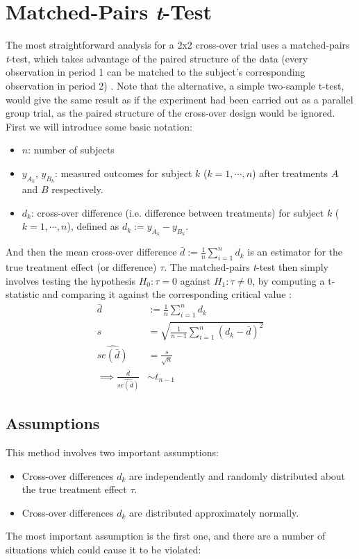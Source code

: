 \documentclass[12pt, TexShade, letterpaper]{report}
\begin{document}
\section{Matched-Pairs \textit{t}-Test}
The most straightforward analysis for a 2x2 cross-over trial uses a matched-pairs \textit{t}-test, which takes advantage of the paired structure of the data (every observation in period 1 can be matched to the subject's corresponding observation in period 2) \cite{senn2002crossover}. Note that the alternative, a simple two-sample t-test, would give the same result as if the experiment had been carried out as a parallel group trial, as the paired structure of the cross-over design would be ignored. First we will introduce some basic notation:
\begin{itemize}
    \item $n$: number of subjects
    \item $y_{A_k}$, $y_{B_k}$: measured outcomes for subject $k$ ($k=1,\cdots,n$) after treatments $A$ and $B$ respectively.
    \item $d_k$: cross-over difference (i.e. difference between treatments) for subject $k$ ($k=1,\cdots,n$), defined as $d_k := y_{A_k}-y_{B_k}$.
\end{itemize}
And then the mean cross-over difference $\bar{d} := \frac{1}{n}\sum_{i=1}^{n}d_k$ is an estimator for the true treatment effect (or difference) $\tau$. The matched-pairs \textit{t}-test then simply involves testing the hypothesis $H_0: \tau = 0$ against $H_1: \tau \neq 0$, by computing a t-statistic and comparing it against the corresponding critical value \cite{senn2002crossover}:
\begin{align*}
    \bar{d} &:= \frac{1}{n}\sum_{i=1}^{n}d_k \\
    s &= \sqrt{\frac{1}{n-1}\sum_{i=1}^{n}(d_k-\bar{d})^2} \\
    \widehat{se(\bar{d})} &= \frac{s}{\sqrt{n}} \\
    \implies \frac{\bar{d}}{\widehat{se(\bar{d})}} &\sim t_{n-1}
\end{align*}

\subsection{Assumptions}
This method involves two important assumptions:
\begin{itemize}
    \item Cross-over differences $d_k$ are independently and randomly distributed about the true treatment effect $\tau$.
    \item Cross-over differences $d_k$ are distributed approximately normally.
\end{itemize}
The most important assumption is the first one, and there are a number of situations which could cause it to be violated:
\end{document}
